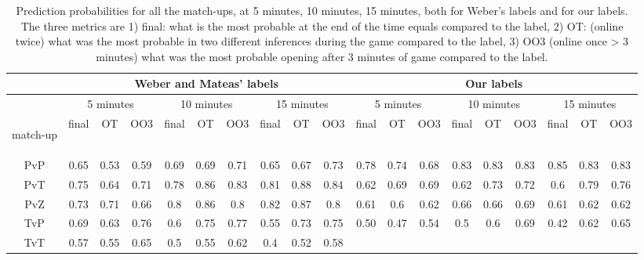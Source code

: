 \begin{table}
\caption{Prediction probabilities for all the match-ups, at 5 minutes, 10 minutes, 15 minutes, both for Weber's labels and for our labels. The three metrics are 1) final: what is the most probable at the end of the time equals compared to the label, 2) OT: (online twice) what was the most probable in two different inferences during the game compared to the label, 3) OO3 (online once > 3 minutes) what was the most probable opening after 3 minutes of game compared to the label.}
\begin{center}
\begin{tabular}{|c|ccc|ccc|ccc|ccc|ccc|ccc|}
\hline
& \multicolumn{9}{|c|}{Weber and Mateas' labels}
& \multicolumn{9}{|c|}{Our labels}
\\  \hline
& \multicolumn{3}{|c|}{5 minutes}
& \multicolumn{3}{|c|}{10 minutes}
& \multicolumn{3}{|c|}{15 minutes}
& \multicolumn{3}{|c|}{5 minutes}
& \multicolumn{3}{|c|}{10 minutes}
& \multicolumn{3}{|c|}{15 minutes}
\\
\begin{scriptsize}match-up\end{scriptsize}
& final
& OT
& OO3
& final
& OT
& OO3
& final
& OT
& OO3
& final
& OT
& OO3
& final
& OT
& OO3
& final
& OT
& OO3 \\ \hline
PvP & 0.65 & 0.53 & 0.59 & 0.69 & 0.69 & 0.71 & 0.65 & 0.67 & 0.73
& 0.78 & 0.74 & 0.68 & 0.83 & 0.83 & 0.83 & 0.85 & 0.83 & 0.83 \\
PvT & 0.75 & 0.64 & 0.71 & 0.78 & 0.86 & 0.83 & 0.81 & 0.88 & 0.84
& 0.62 & 0.69 & 0.69 & 0.62 & 0.73 & 0.72 & 0.6 & 0.79 & 0.76 \\
PvZ & 0.73 & 0.71 & 0.66 & 0.8 & 0.86 & 0.8 & 0.82 & 0.87 & 0.8
& 0.61 & 0.6 & 0.62 & 0.66 & 0.66 & 0.69 & 0.61 & 0.62 & 0.62 \\
TvP & 0.69 & 0.63 & 0.76 & 0.6 & 0.75 & 0.77 & 0.55 & 0.73 & 0.75
& 0.50 & 0.47 & 0.54 & 0.5 & 0.6 & 0.69 & 0.42 & 0.62 & 0.65 \\
TvT & 0.57 & 0.55 & 0.65 & 0.5 & 0.55 & 0.62 & 0.4 & 0.52 & 0.58

\end{tabular}
\end{center}
\end{table}
